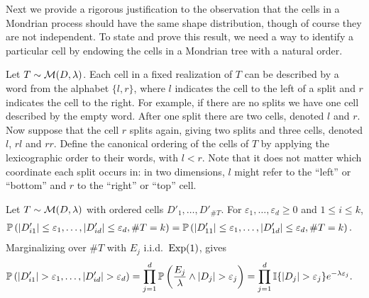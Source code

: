 Next we provide a rigorous justification to the observation that the cells
in a Mondrian process should have the same shape distribution, though
of course they are not independent. To state and prove this result,
we need a way to identify a particular cell by endowing the
cells in a Mondrian tree with a natural order.

\begin{definition}
  Let $T \sim \cM(D, \lambda)$.
  Each cell in a fixed realization of $T$ can be described by
  a word from the alphabet $\{l, r\}$,
  where $l$ indicates the cell to the left of a split
  and $r$ indicates the cell to the right.
  For example, if there are no splits we have one cell
  described by the empty word.
  After one split there are two cells, denoted
  $l$ and $r$.
  Now suppose that the cell $r$ splits again, giving two splits and three cells,
  denoted $l$, $r l$ and $r r$.
  Define the canonical ordering of the cells of $T$ by applying
  the lexicographic order to their words, with $l < r$.
  Note that it does not matter which coordinate each split occurs in:
  in two dimensions, $l$ might refer to the ``left'' or ``bottom''
  and $r$ to the ``right'' or ``top'' cell.
\end{definition}

\begin{lemma}
  \label{lem:cells_identically_distributed}

  Let $T \sim \cM(D, \lambda)$
  with ordered cells $D'_1, \ldots, D'_{\# T}$.
  For $\varepsilon_1, \ldots, \varepsilon_d \geq 0$
  and $1 \leq i \leq k$,
  \begin{align*}
    \P\left(
      |D'_{i1}| \leq \varepsilon_1,
      \ldots, |D'_{id}| \leq \varepsilon_d,
      \# T = k
    \right)
    &=
    \P\left(
      |D'_{11}| \leq \varepsilon_1,
      \ldots, |D'_{1d}| \leq \varepsilon_d,
      \# T = k
    \right).
  \end{align*}
  Marginalizing over $\# T$
  with $E_j$ i.i.d.\ $\Exp(1)$,
  \citet[Proposition~1]{mourtada2020minimax} gives
  \begin{align*}
    \P\left(
      |D'_{i1}| > \varepsilon_1,
      \ldots, |D'_{id}| > \varepsilon_d
    \right)
    &=
    \prod_{j=1}^d
    \P\left(
      \frac{E_j}{\lambda} \wedge |D_j|
      > \varepsilon_j
    \right)
    = \prod_{j=1}^d
    \I\{|D_j| > \varepsilon_j\}
    e^{-\lambda \varepsilon_j}.
  \end{align*}

\end{lemma}

